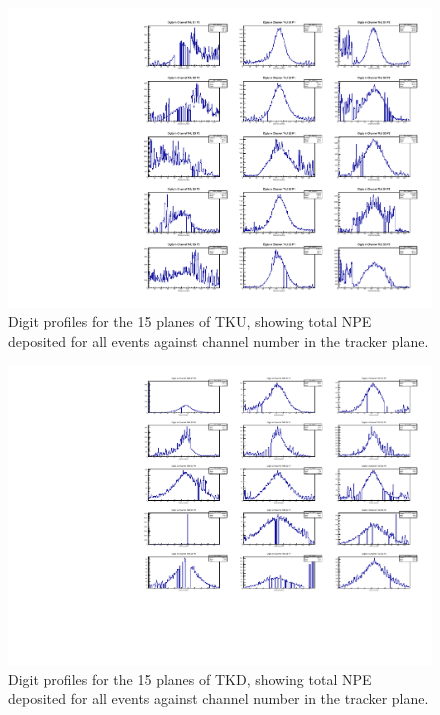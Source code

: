 \begin{figure}[ht]
\begin{center}
\includegraphics[width=0.6\textheight,keepaspectratio=true,]{Digits_Up.pdf}
\end{center}
\caption{Digit profiles for the 15 planes of TKU, showing total NPE deposited for all events against channel number in the tracker plane.}
\label{Figure:Digits_Up}
\end{figure}

\begin{figure}[ht]
\begin{center}
\includegraphics[width=0.6\textheight,keepaspectratio=true,]{Digits_Down.pdf}
\end{center}
\caption{Digit profiles for the 15 planes of TKD, showing total NPE deposited for all events against channel number in the tracker plane.}
\label{Figure:Digits_Down}
\end{figure}

